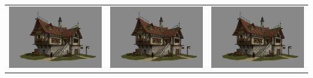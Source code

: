 \documentclass[12pt]{article}
\begin{document}
\begin{tabular}{lcr}
    \includegraphics[scale = 0.3]{donghee-han-d2.jpg} & \includegraphics[scale = 0.3]{donghee-han-d2.jpg} & \includegraphics[scale = 0.3]{donghee-han-d2.jpg} \\[0.4cm]

\end{tabular}
\end{document}
